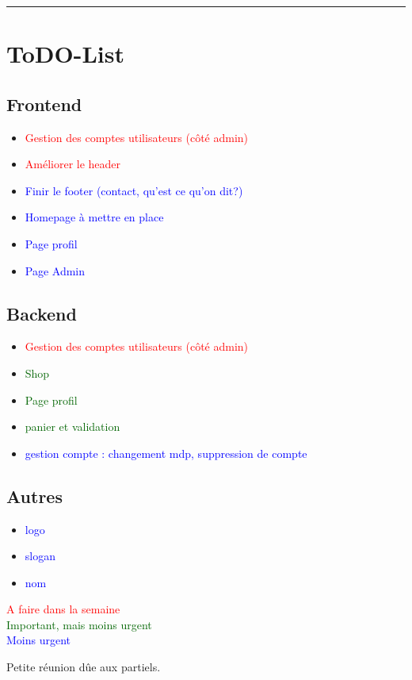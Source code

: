 \documentclass[10pt,a4paper]{report}
\begin{document}
\noindent\rule{\linewidth}{0.5mm} \bigskip
\section{ToDO-List}
\subsection*{Frontend}
\begin{itemize}
        \item \textcolor{red}{Gestion des comptes utilisateurs (côté admin)}
        \item \textcolor{red}{Améliorer le header}
        \item \textcolor{blue}{Finir le footer (contact, qu’est ce qu’on dit?)}
        \item \textcolor{blue}{Homepage à mettre en place}
        \item \textcolor{blue}{Page profil}
        \item \textcolor{blue}{Page Admin}
\end{itemize}

\subsection*{Backend}
\begin{itemize}
        \item \textcolor{red}{Gestion des comptes utilisateurs (côté admin)}
        \item \textcolor{darkgreen}{Shop}
        \item \textcolor{darkgreen}{Page profil}
        \item \textcolor{darkgreen}{panier et validation}
        \item \textcolor{blue}{gestion compte : changement mdp, suppression de compte}
\end{itemize}

\subsection*{Autres}
\begin{itemize}
        \item \textcolor{blue}{logo}
        \item \textcolor{blue}{slogan}
        \item \textcolor{blue}{nom}
\end{itemize}

\textcolor{red}{A faire dans la semaine} \\
\textcolor{darkgreen}{Important, mais moins urgent} \\
\textcolor{blue}{Moins urgent}
\\
\bigskip

Petite réunion dûe aux partiels.
\end{document}
